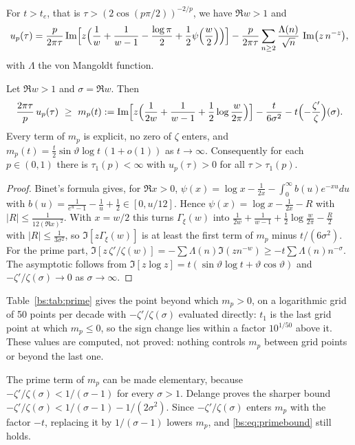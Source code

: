 \begin{remark}[primes]\label{bs:rem:primes}
For $t>t_e$, that is $\tau>(2\cos(p\pi/2))^{-2/p}$, we have $\Re w>1$ and
\[
u_p(\tau)=\frac{p}{2\pi\tau}\Im\Bigl[z\Bigl(\frac1w+\frac1{w-1}-\frac{\log\pi}{2}+\frac12\psi\Bigl(\frac w2\Bigr)\Bigr)\Bigr]-\frac{p}{2\pi\tau}\sum_{n\ge2}\frac{\Lambda(n)}{\sqrt n}\,\Im\bigl(z\,n^{-z}\bigr),
\]
with $\Lambda$ the von Mangoldt function.
\end{remark}

\begin{proposition}\label{bs:prop:prime}
Let $\Re w>1$ and $\sigma=\Re w$. Then
\begin{equation}\label{bs:eq:primebound}
\frac{2\pi\tau}{p}\,u_p(\tau)\ \ge\ m_p(t):=\Im\Bigl[z\Bigl(\frac1{2w}+\frac1{w-1}+\frac12\log\frac{w}{2\pi}\Bigr)\Bigr]-\frac{t}{6\sigma^2}-t\Bigl(-\frac{\zeta'}{\zeta}\Bigr)(\sigma).
\end{equation}
Every term of $m_p$ is explicit, no zero of $\zeta$ enters, and $m_p(t)=\frac t2\sin\vartheta\log t\,(1+o(1))$ as $t\to\infty$. Consequently for each $p\in(0,1)$ there is $\tau_1(p)<\infty$ with $u_p(\tau)>0$ for all $\tau>\tau_1(p)$.
\end{proposition}

\begin{proof}
Binet's formula \cite[(5.9.13)]{DLMF} gives, for $\Re x>0$, $\psi(x)=\log x-\frac1{2x}-\int_0^\infty b(u)e^{-xu}du$ with $b(u)=\frac1{e^u-1}-\frac1u+\frac12\in[0,u/12]$. Hence $\psi(x)=\log x-\frac1{2x}-R$ with $|R|\le\frac1{12(\Re x)^2}$. With $x=w/2$ this turns $\Gamma_\xi(w)$ into $\frac1{2w}+\frac1{w-1}+\frac12\log\frac w{2\pi}-\frac R2$ with $|R|\le\frac1{3\sigma^2}$, so $\Im[z\Gamma_\xi(w)]$ is at least the first term of $m_p$ minus $t/(6\sigma^2)$. For the prime part, $\Im[z\,\zeta'/\zeta(w)]=-\sum\Lambda(n)\Im(zn^{-w})\ge-t\sum\Lambda(n)n^{-\sigma}$. The asymptotic follows from $\Im[z\log z]=t(\sin\vartheta\log t+\vartheta\cos\vartheta)$ and $-\zeta'/\zeta(\sigma)\to0$ as $\sigma\to\infty$.
\end{proof}

Table~\ref{bs:tab:prime} gives the point beyond which $m_p>0$, on a logarithmic grid of 50 points per decade with $-\zeta'/\zeta(\sigma)$ evaluated directly: $t_1$ is the last grid point at which $m_p\le0$, so the sign change lies within a factor $10^{1/50}$ above it. These values are computed, not proved: nothing controls $m_p$ between grid points or beyond the last one.

The prime term of $m_p$ can be made elementary, because $-\zeta'/\zeta(\sigma)<1/(\sigma-1)$ for every $\sigma>1$. Delange \cite[Th\'eor\`eme]{Delange87} proves the sharper bound $-\zeta'/\zeta(\sigma)<1/(\sigma-1)-1/(2\sigma^2)$. Since $-\zeta'/\zeta(\sigma)$ enters $m_p$ with the factor $-t$, replacing it by $1/(\sigma-1)$ lowers $m_p$, and \eqref{bs:eq:primebound} still holds.

